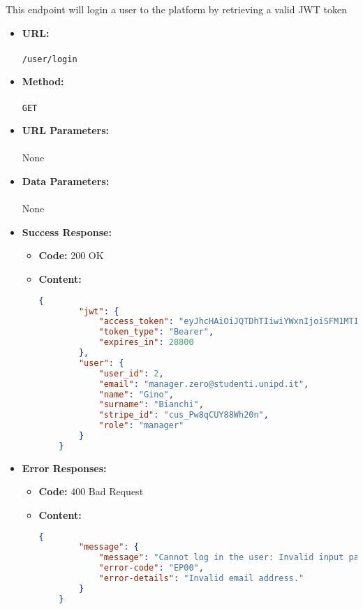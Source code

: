

This endpoint will login a user to the platform by retrieving a valid JWT token

\begin{itemize}
	\item \textbf{URL:} \\\\\texttt{/user/login}
	\item \textbf{Method:} \\\\\texttt{GET}
	\item \textbf{URL Parameters:} \\\\None
	\item \textbf{Data Parameters:} \\\\None
	\item \textbf{Success Response:}
	\begin{itemize}
		\item[$\circ$] \textbf{Code:} 200 OK
		\item[] \textbf{Content:}
		\begin{lstlisting}[language=json]
    {
        "jwt": {
            "access_token": "eyJhcHAiOiJQTDhTIiwiYWxnIjoiSFM1MTIifQ.eyJ1aWQiOjIsInJvbCI6Im1hbmFnZXI iLCJzdHIiOiJjdXNfUHc4cUNVWTg4V2gyMG4iLCJkYXQiOjE3MTQyODI5NDA2MDB9.FtoQG unPFNcmYupNfLS1gsdpPRpv3lb4YlbUB61AfTH8DvuI0ATXOsiXAHvi9P3EhpzoAtvmqBFF Lh88782Z0g",
            "token_type": "Bearer",
            "expires_in": 28800
        },
        "user": {
            "user_id": 2,
            "email": "manager.zero@studenti.unipd.it",
            "name": "Gino",
            "surname": "Bianchi",
            "stripe_id": "cus_Pw8qCUY88Wh20n",
            "role": "manager"
        }
    }
		\end{lstlisting}
	\end{itemize}
	
    \item \textbf{Error Responses:}
    	\begin{itemize}
			\item[$\circ$] \textbf{Code:} 400 Bad Request
			\item[] \textbf{Content:}
			\begin{lstlisting}[language=json]
    {
        "message": {
            "message": "Cannot log in the user: Invalid input parameters.",
            "error-code": "EP00",
            "error-details": "Invalid email address."
        }
    }
			\end{lstlisting}


\end{itemize}
\end{itemize}
